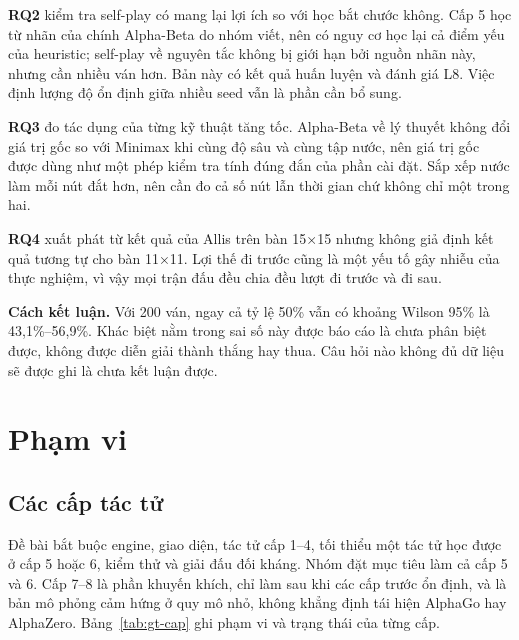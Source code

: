 \textbf{RQ2} kiểm tra self-play có mang lại lợi ích so với học bắt chước không. Cấp 5 học từ nhãn của chính Alpha-Beta do nhóm viết, nên có nguy cơ học lại cả điểm yếu của heuristic; self-play về nguyên tắc không bị giới hạn bởi nguồn nhãn này, nhưng cần nhiều ván hơn. Bản này có kết quả huấn luyện và đánh giá L8. Việc định lượng độ ổn định giữa nhiều seed vẫn là phần cần bổ sung.

\textbf{RQ3} đo tác dụng của từng kỹ thuật tăng tốc. Alpha-Beta về lý thuyết không đổi giá trị gốc so với Minimax khi cùng độ sâu và cùng tập nước, nên giá trị gốc được dùng như một phép kiểm tra tính đúng đắn của phần cài đặt. Sắp xếp nước làm mỗi nút đắt hơn, nên cần đo cả số nút lẫn thời gian chứ không chỉ một trong hai.

\textbf{RQ4} xuất phát từ kết quả của Allis trên bàn 15×15 \cite{allis1994} nhưng không giả định kết quả tương tự cho bàn 11×11. Lợi thế đi trước cũng là một yếu tố gây nhiễu của thực nghiệm, vì vậy mọi trận đấu đều chia đều lượt đi trước và đi sau.

\textbf{Cách kết luận.} Với 200 ván, ngay cả tỷ lệ 50\% vẫn có khoảng Wilson 95\% là 43,1\%--56,9\%. Khác biệt nằm trong sai số này được báo cáo là chưa phân biệt được, không được diễn giải thành thắng hay thua. Câu hỏi nào không đủ dữ liệu sẽ được ghi là chưa kết luận được.

\section{Phạm vi}
\label{sec:gt-pham-vi}

\subsection{Các cấp tác tử}
\label{sec:gt-pham-vi-cap}
Đề bài bắt buộc engine, giao diện, tác tử cấp 1--4, tối thiểu một tác tử học được ở cấp 5 hoặc 6, kiểm thử và giải đấu đối kháng. Nhóm đặt mục tiêu làm cả cấp 5 và 6. Cấp 7--8 là phần khuyến khích, chỉ làm sau khi các cấp trước ổn định, và là bản mô phỏng cảm hứng ở quy mô nhỏ, không khẳng định tái hiện AlphaGo hay AlphaZero. Bảng~\ref{tab:gt-cap} ghi phạm vi và trạng thái của từng cấp.

